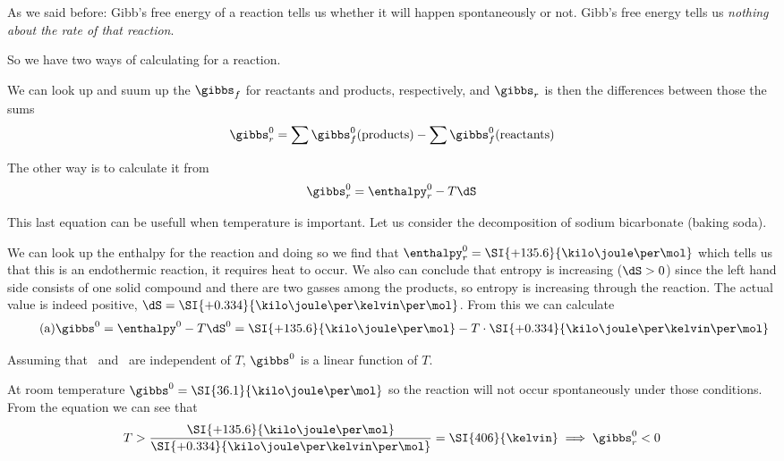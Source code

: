 \documentclass[../mit-general-chemistry.tex]{subfiles}
\begin{document}
As we said before: Gibb's free energy of a reaction tells us whether
it will happen spontaneously or not. Gibb's free energy tells us
{\em nothing about the rate of that reaction}.






So we have two ways of calculating \gibbs for a reaction.

We can look up and suum up the $\gibbs_f$ for reactants and products,
respectively, and $\gibbs_r$ is then the differences between those
the sums
\begin{equation*}
  \gibbs^0_r = \sum\gibbs^0_f(\text{products}) - \sum\gibbs^0_f(\text{reactants})
\end{equation*}


The other way is to calculate it from
\begin{equation*}
  \gibbs^0_r = \enthalpy^0_r - T\dS
\end{equation*}

This last equation can be usefull when temperature is important. Let
us consider the decomposition of sodium bicarbonate (baking soda).


We can look up the enthalpy for the reaction and doing so we find that
$\enthalpy_r^0 = \SI{+135.6}{\kilo\joule\per\mol}$ which tells us that
this is an endothermic reaction, it requires heat to occur. We also
can conclude that entropy is increasing ($\dS > 0$) since the left
hand side consists of one solid compound and there are two gasses
among the products, so entropy is increasing through the reaction. The
actual value is indeed positive, $\dS =
\SI{+0.334}{\kilo\joule\per\kelvin\per\mol}$. From this we can
calculate
\begin{equation*}\tag{a}
  \gibbs^0 = \enthalpy^0 - T \dS^0
  = \SI{+135.6}{\kilo\joule\per\mol}
  - T\cdot \SI{+0.334}{\kilo\joule\per\kelvin\per\mol}
\end{equation*}



Assuming that \dS\ and \enthalpy\ are independent of $T$,
$\gibbs^0$ is a linear function of $T$.

At room temperature $\gibbs^0 = \SI{36.1}{\kilo\joule\per\mol}$ so the
reaction will not occur spontaneously under those conditions. From the
equation we can see that
\begin{equation*}
  T > \frac{\SI{+135.6}{\kilo\joule\per\mol}}{\SI{+0.334}{\kilo\joule\per\kelvin\per\mol}} = 
  \SI{406}{\kelvin}
  \implies
  \gibbs^0_r < 0
\end{equation*}
\end{document}
